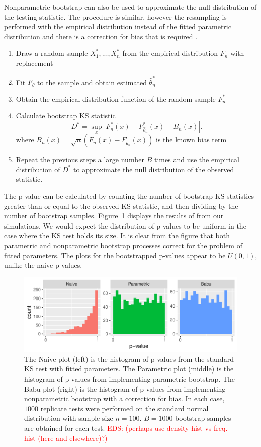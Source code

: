 \documentclass[12pt, letterpaper, titlepage]{article}
\newcommand{\eds}[1]{\textcolor{red}{EDS: (#1)}}
\begin{document}
Nonparametric bootstrap can also be used to approximate the null distribution
of the testing statistic. The procedure is similar, however the resampling is
performed with the empirical distribution instead of the fitted parametric
distribution and there is a correction for bias that is required
\citep{Babu}.
\begin{enumerate}
  \item
    Draw a random sample $X_1^*,...,X_n^*$ from the empirical distribution $F_n$
    with replacement
  \item
    Fit $F_\theta$ to the sample and obtain estimated $\hat\theta_n^*$
  \item
    Obtain the empirical distribution function of the random sample $F_n^*$
  \item
    Calculate bootstrap KS statistic
    \[
      D^* = \sup_x | F_n^* (x)- F_{\hat\theta_n}^*(x) - B_n(x) |.
    \]
    where $B_{n}(x) = \sqrt{n}(F_{n}(x) - F_{\hat\theta_n}(x))$ is the known
    bias term \citep{Babu}
  \item
    Repeat the previous steps a large number $B$ times and use the empirical
    distribution of $D^*$ to approximate the null distribution of the observed
    statistic.
\end{enumerate}
The p-value can be calculated by counting the number of bootstrap KS
statistics greater than or equal to the observed KS statistic, and then dividing
by the number of bootstrap samples. Figure~\ref{fig:hist_fitted} displays the
results of from our simulations. We would expect the distribution of p-values
to be uniform in the case where the KS test holds its size. It is clear from the
figure that both parametric and nonparametric bootstrap processes correct for
the problem of fitted parameters. The plots for the bootstrapped p-values appear
to be $U(0,1)$, unlike the naive p-values.

\begin{figure}[tbp]
  \centering
  \includegraphics[width=\textwidth]{hist_fitted}
  \caption{The Naive plot (left) is the histogram of p-values from the standard
  KS test with fitted parameters. The Parametric plot (middle) is the histogram
  of p-values from implementing parametric bootstrap. The Babu plot (right) is
  the histogram of p-values from implementing nonparametric bootstrap with a
  correction for bias. In each case, $1000$ replicate tests were performed on
  the standard normal distribution with sample size $n = 100$. $B = 1000$
  bootstrap samples are obtained for each test. \eds{perhaps use density hist vs
	freq. hist (here and elsewhere)?}}
  \label{fig:hist_fitted}
\end{figure}
\end{document}

